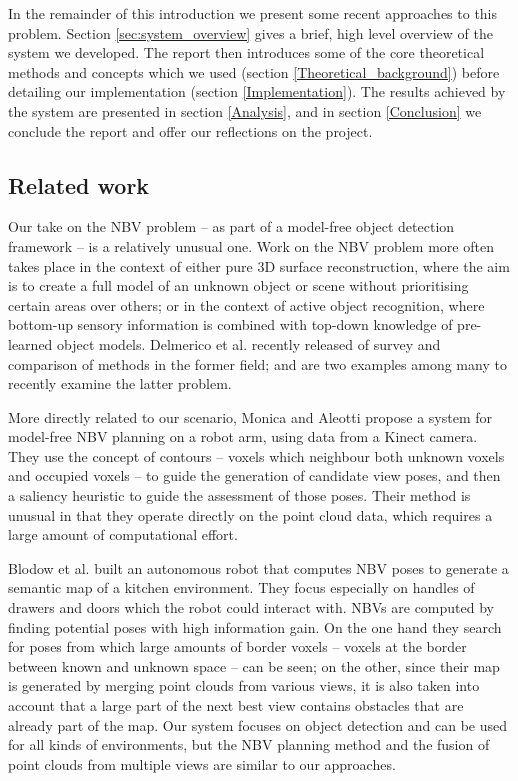 In the remainder of this introduction we present some recent approaches to this problem.
Section \ref{sec:system_overview} gives a brief, high level overview of the system we developed.
The report then introduces some of the core theoretical methods and concepts which we used (section \ref{Theoretical_background}) before detailing our implementation (section \ref{Implementation}).
The results achieved by the system are presented in section \ref{Analysis}, and in section \ref{Conclusion} we conclude the report and offer our reflections on the project.

\subsection{Related work}
\label{sub:related_work}

Our take on the NBV problem -- as part of a model-free object detection framework -- is a relatively unusual one.
Work on the NBV problem more often takes place in the context of either pure 3D surface reconstruction, where the aim is to create a full model of an unknown object or scene without prioritising certain areas over others; or in the context of active object recognition, where bottom-up sensory information is combined with top-down knowledge of pre-learned object models.
Delmerico et al.\cite{delmerico2017nbvsurvey} recently released of survey and comparison of methods in the former field; \cite{xu2016} and \cite{doumanoglou2016} are two examples among many to recently examine the latter problem.

More directly related to our scenario, Monica and Aleotti\cite{monica2017} propose a system for model-free NBV planning on a robot arm, using data from a Kinect camera.
They use the concept of contours -- voxels which neighbour both unknown voxels and occupied voxels -- to guide the generation of candidate view poses, and then a saliency heuristic to guide the assessment of those poses.
Their method is unusual in that they operate directly on the point cloud data, which requires a large amount of computational effort.

Blodow et al.\cite{blodow2011autonomous} built an autonomous robot that computes NBV poses to generate a semantic map of a kitchen environment.
They focus especially on handles of drawers and doors which the robot could interact with.
NBVs are computed by finding potential poses with high information gain.
On the one hand they search for poses from which large amounts of border voxels -- voxels at the border between known and unknown space -- can be seen; on the other, since their map is generated by merging point clouds from various views, it is also taken into account that a large part of the next best view contains obstacles that are already part of the map.
Our system focuses on object detection and can be used for all kinds of environments, but the NBV planning method and the fusion of point clouds from multiple views are similar to our approaches.

